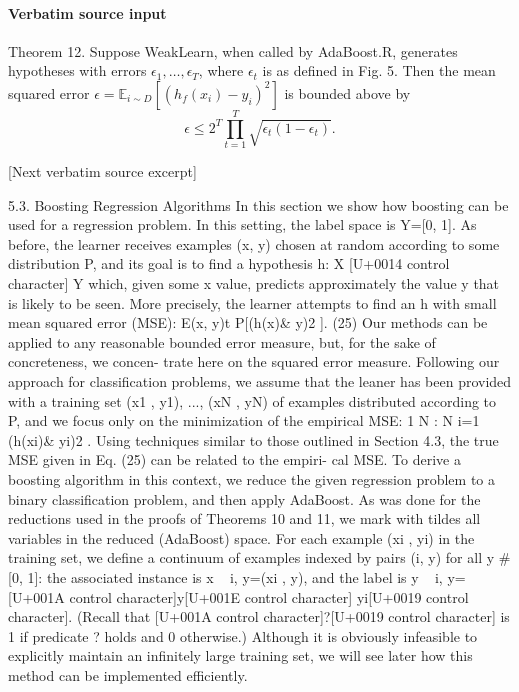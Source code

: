 \documentclass[10pt]{article}
\begin{document}
\paragraph{Verbatim source input}
\begin{ReviewVerbatim}
Theorem 12. Suppose WeakLearn, when called by AdaBoost.R, generates
hypotheses with errors $\epsilon_1,\ldots,\epsilon_T$, where $\epsilon_t$ is
as defined in Fig. 5. Then the mean squared error
$\epsilon=\mathbb E_{i\sim D}[(h_f(x_i)-y_i)^2]$ is bounded above by
$$
\epsilon\leq2^T\prod_{t=1}^T\sqrt{\epsilon_t(1-\epsilon_t)}. \tag{26}
$$

[Next verbatim source excerpt]

5.3. Boosting Regression Algorithms
In this section we show how boosting can be used for a
regression problem. In this setting, the label space is
Y=[0, 1]. As before, the learner receives examples (x, y)
chosen at random according to some distribution P, and its
goal is to find a hypothesis h: X [U+0014 control character] Y which, given some x
value, predicts approximately the value y that is likely to be
seen. More precisely, the learner attempts to find an h with
small mean squared error (MSE):
E(x, y)t P[(h(x)& y)2
]. (25)
Our methods can be applied to any reasonable bounded
error measure, but, for the sake of concreteness, we concen-
trate here on the squared error measure.
Following our approach for classification problems, we
assume that the leaner has been provided with a training set
(x1 , y1), ..., (xN , yN) of examples distributed according to
P, and we focus only on the minimization of the empirical
MSE:
1
N
:
N
i=1
(h(xi)& yi)2
.
Using techniques similar to those outlined in Section 4.3,
the true MSE given in Eq. (25) can be related to the empiri-
cal MSE.
To derive a boosting algorithm in this context, we reduce
the given regression problem to a binary classification
problem, and then apply AdaBoost. As was done for the
reductions used in the proofs of Theorems 10 and 11, we
mark with tildes all variables in the reduced (AdaBoost)
space. For each example (xi , yi) in the training set, we
define a continuum of examples indexed by pairs (i, y) for
all y # [0, 1]: the associated instance is x
~ i, y=(xi , y), and
the label is y
~ i, y=[U+001A control character]y[U+001E control character] yi[U+0019 control character]. (Recall that [U+001A control character]?[U+0019 control character] is 1 if predicate
? holds and 0 otherwise.) Although it is obviously infeasible
to explicitly maintain an infinitely large training set, we will
see later how this method can be implemented efficiently.

\end{ReviewVerbatim}
\end{document}
